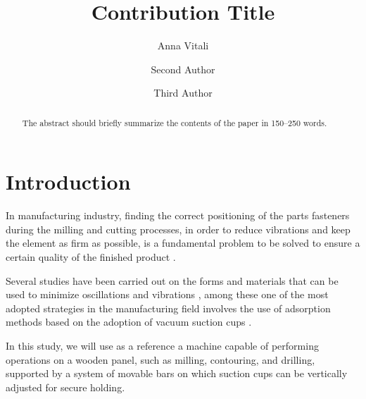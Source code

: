 \documentclass[runningheads]{llncs}
\begin{document}
%
\title{Contribution Title}
%
%
\author{Anna Vitali \and
Second Author \and
Third Author}
%
%
%
\maketitle              %
%
\begin{abstract}
The abstract should briefly summarize the contents of the paper in
150--250 words.

\end{abstract}
%
%
%

\section{Introduction}

In manufacturing industry, finding the correct positioning of the parts fasteners during the milling and cutting processes, in order to reduce vibrations and keep the element as firm as possible, is a fundamental problem to be solved to ensure a certain quality of the finished product \cite{fei2020state}.

Several studies have been carried out on the forms and materials that can be used to minimize oscillations and vibrations \cite{sivasubramanian2019optimization,chung2001materials}, among these one of the most adopted strategies in the manufacturing field involves the use of adsorption methods based on the adoption of vacuum suction cups \cite{zhu2006principle,del2019thin}.

In this study, we will use as a reference a machine capable of performing operations on a wooden panel, such as milling, contouring, and drilling, supported by a system of movable bars on which suction cups can be vertically adjusted for secure holding. 
\end{document}
